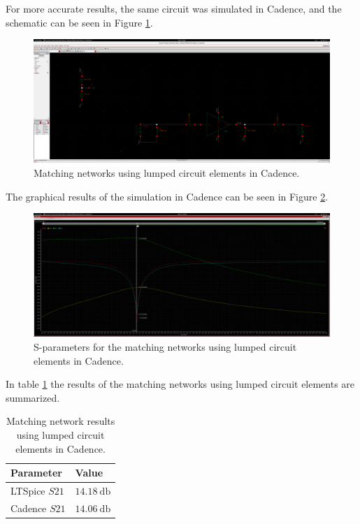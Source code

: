 For more accurate results, the same circuit was simulated in Cadence, and the schematic can be seen in Figure \ref{fig:CadenceLCMatchingCircuit}.
\begin{figure}[H]
    \centering
    \includegraphics[width=1\textwidth]{Images/CadenceLCcircuit.png}
    \caption{Matching networks using lumped circuit elements in Cadence.}
    \label{fig:CadenceLCMatchingCircuit}
\end{figure}

The graphical results of the simulation in Cadence can be seen in Figure \ref{fig:CadenceLC}.
\begin{figure}[H]
    \centering
    \includegraphics[width=1\textwidth]{Images/CAD-LC_matching.png}
    \caption{S-parameters for the matching networks using lumped circuit elements in Cadence.}
    \label{fig:CadenceLC}
\end{figure}

In table \ref{tab:LCMatchingParameters} the results of the matching networks using lumped circuit elements are summarized.

\begin{table}[H]
    \centering
    \caption{Matching network results using lumped circuit elements in Cadence.}
    \begin{tabularx}{\textwidth}{>{\centering\arraybackslash}X >{\centering\arraybackslash}X}
        \toprule
        \textbf{Parameter} & \textbf{Value} \\
        \midrule
        LTSpice $S21$  & $\SI{14.18}{\decibel}$ \\
        \midrule
        Cadence $S21$ & $\SI{14.06}{\decibel}$ \\
        \bottomrule
    \end{tabularx}
    \label{tab:LCMatchingParameters}
\end{table}

